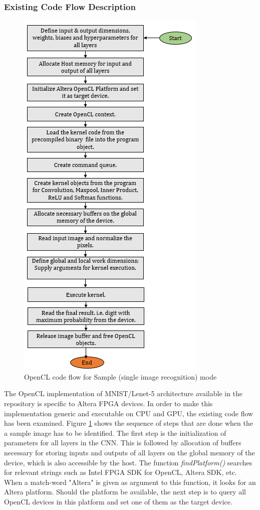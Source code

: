 \subsubsection{Existing Code Flow Description}
\label{4_1_3_2}
\begin{figure}[h!]
\centering
\includegraphics[width=0.5\linewidth]{figures/opencl_flow_lenet5.png}
\caption{OpenCL code flow for Sample (single image recognition) mode \cite{mnist-altera-opencl}}
\label{fig:opencl_flow_lenet5}
\end{figure}
The OpenCL implementation of MNIST/Lenet-5 architecture available in the repository \cite{mnist-altera-opencl} is specific to Altera FPGA devices. In order to make this implementation generic and executable on CPU and GPU, the existing code flow has been examined. Figure \ref{fig:opencl_flow_lenet5} shows the sequence of steps that are done when the a sample image has to be identified.\newline \newline
The first step is the initialization of parameters for all layers in the CNN. This is followed by allocation of buffers necessary for storing inputs and outputs of all layers on the global memory of the device, which is also accessible by the host. The function \textit{ findPlatform()} searches for relevant strings such as Intel FPGA SDK for OpenCL, Altera SDK, etc. When a match-word "Altera" is given as argument to this function, it looks for an Altera platform. Should the platform be available, the next step is to query all OpenCL devices in this platform and set one of them as the target device. \newline\newline
